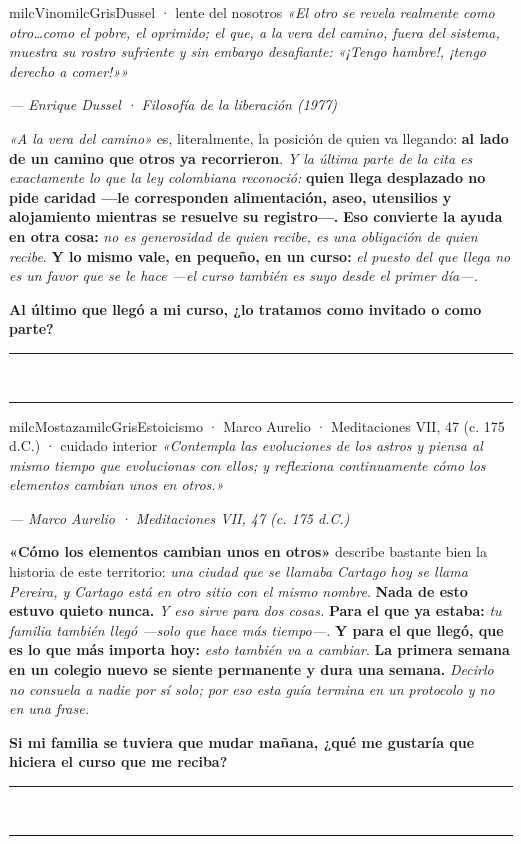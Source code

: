 \documentclass[11pt,letterpaper]{article}
\newcommand{\linead}[1]{\noindent\color{milcLinea}\rule{#1}{0.5pt}\color{milcNegro}}
\begin{document}
\begin{softbox}{milcVino}{milcGris}{Dussel · lente del nosotros}
\textit{«El otro se revela realmente como otro\ldots como el pobre, el oprimido; el que, a la vera del camino, fuera del sistema, muestra su rostro sufriente y sin embargo desafiante: «¡Tengo hambre!, ¡tengo derecho a comer!»»}

{\footnotesize\itshape\color{milcNegro!70}--- Enrique Dussel · Filosofía de la liberación (1977)}

\emph{«A la vera del camino»} es, literalmente, la posición de quien va llegando: \textbf{al lado de un camino que otros ya recorrieron}. \emph{Y la última parte de la cita es exactamente lo que la ley colombiana reconoció:} \textbf{quien llega desplazado no pide caridad ---le corresponden alimentación, aseo, utensilios y alojamiento mientras se resuelve su registro---.} \textbf{Eso convierte la ayuda en otra cosa:} \emph{no es generosidad de quien recibe, es una obligación de quien recibe}. \textbf{Y lo mismo vale, en pequeño, en un curso:} \emph{el puesto del que llega no es un favor que se le hace ---el curso también es suyo desde el primer día---.}

\textbf{Al último que llegó a mi curso, ¿lo tratamos como invitado o como parte?}
\end{softbox}
\linead{\linewidth}\\[1mm]
\linead{\linewidth}

\begin{softbox}{milcMostaza}{milcGris}{Estoicismo · Marco Aurelio · Meditaciones VII, 47 (c. 175 d.C.) · cuidado interior}
\textit{«Contempla las evoluciones de los astros y piensa al mismo tiempo que evolucionas con ellos; y reflexiona continuamente cómo los elementos cambian unos en otros.»}

{\footnotesize\itshape\color{milcNegro!70}--- Marco Aurelio · Meditaciones VII, 47 (c. 175 d.C.)}

\textbf{«Cómo los elementos cambian unos en otros»} describe bastante bien la historia de este territorio: \emph{una ciudad que se llamaba Cartago hoy se llama Pereira, y Cartago está en otro sitio con el mismo nombre}. \textbf{Nada de esto estuvo quieto nunca.} \emph{Y eso sirve para dos cosas.} \textbf{Para el que ya estaba:} \emph{tu familia también llegó ---solo que hace más tiempo---.} \textbf{Y para el que llegó, que es lo que más importa hoy:} \emph{esto también va a cambiar}. \textbf{La primera semana en un colegio nuevo se siente permanente y dura una semana.} \emph{Decirlo no consuela a nadie por sí solo; por eso esta guía termina en un protocolo y no en una frase.}

\textbf{Si mi familia se tuviera que mudar mañana, ¿qué me gustaría que hiciera el curso que me reciba?}
\end{softbox}
\linead{\linewidth}\\[1mm]
\linead{\linewidth}
\end{document}
